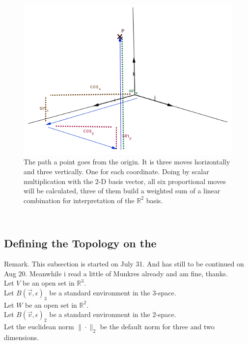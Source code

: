 \documentclass[a4paper]{article}
\begin{document}
\begin{Example}
\begin{figure}[ht]
\includegraphics{pathhacked.png}
\caption{The path a point goes from the origin. It is three moves horizontally and three vertically. One for each coordinate. Doing by scalar multiplication with the 2-D basis vector, all six proportional moves will be calculated, three of them build a weighted sum of a linear combination for interpretation of the $\mathbb{R}^{2}$ basis.}
\end{figure}\\

\subsection{Defining the Topology on the }

Remark. This subsection is started on July 31. And has still to be continued on Aug 20. Meanwhile i read a little of Munkres already and am fine, thanks.\\

Let $V$ be an open set in $\mathbb{R}^{3}$.\\

Let $B(\vec{v}, \epsilon)_{3}$ be a standard environment in the 3-space.\\

Let $W$ be an open set in $\mathbb{R}^{2}$.\\

Let $B(\vec{v}, \epsilon)_{2}$ be a standard environment in the 2-space.\\

Let the euclidean norm $\|\cdot\|_{2}$ be the default norm for three and two dimensions.\\


\end{Example}
\end{document}
